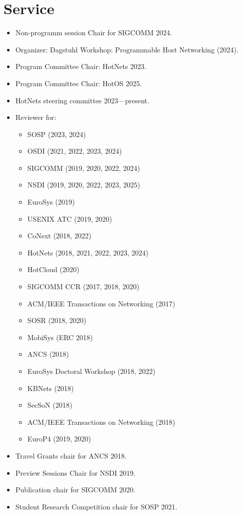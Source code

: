 \documentclass[11pt,letterpaper,sans]{moderncv}        %
\begin{document}
\section{Service}
    \begin{itemize}
        \item Non-programm session Chair for SIGCOMM 2024.
        \item Organizer: Dagstuhl Workshop: Programmable Host Networking
            (2024).
        \item Program Committee Chair: HotNets 2023.
        \item Program Committee Chair: HotOS 2025.
        \item HotNets steering committee 2023---present.
        \item Reviewer for:
            \begin{itemize}
                \item SOSP (2023, 2024)
                \item OSDI (2021, 2022, 2023, 2024)
                \item SIGCOMM (2019, 2020, 2022, 2024)
                \item NSDI (2019, 2020, 2022, 2023, 2025)
                \item EuroSys (2019)
                \item USENIX ATC (2019, 2020)
                \item CoNext (2018, 2022)
                \item HotNets (2018, 2021, 2022, 2023, 2024)
                \item HotCloud (2020)
                \item SIGCOMM CCR (2017, 2018, 2020)
                \item ACM/IEEE Transactions on Networking (2017)
                \item SOSR (2018, 2020)
                \item MobiSys (ERC 2018)
                \item ANCS (2018)
                \item EuroSys Doctoral Workshop (2018, 2022)
                \item KBNets (2018)
                \item SecSoN (2018)
                \item ACM/IEEE Transactions on Networking (2018)
                \item EuroP4 (2019, 2020)
            \end{itemize}
        \item Travel Grants chair for ANCS 2018.
        \item Preview Sessions Chair for NSDI 2019.
        \item Publication chair for SIGCOMM 2020. 
        \item Student Research Competition chair for SOSP 2021. 
    \end{itemize}
\end{document}
